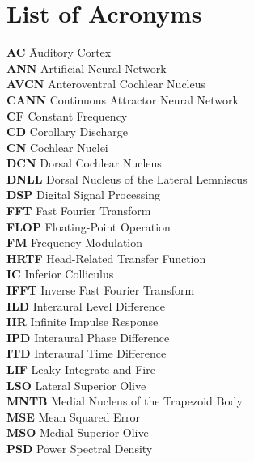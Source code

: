 
\chapter*{List of Acronyms}

\begin{tabbing}
    \textbf{AC} \qquad \= Auditory Cortex \\
    \textbf{ANN} \> Artificial Neural Network \\
    \textbf{AVCN} \> Anteroventral Cochlear Nucleus \\
    \textbf{CANN} \> Continuous Attractor Neural Network \\
    \textbf{CF} \> Constant Frequency \\
    \textbf{CD} \> Corollary Discharge \\
    \textbf{CN} \> Cochlear Nuclei \\
    \textbf{DCN} \> Dorsal Cochlear Nucleus \\
    \textbf{DNLL} \> Dorsal Nucleus of the Lateral Lemniscus \\
    \textbf{DSP} \> Digital Signal Processing \\
    \textbf{FFT} \> Fast Fourier Transform \\
    \textbf{FLOP} \> Floating-Point Operation \\
    \textbf{FM} \> Frequency Modulation \\
    \textbf{HRTF} \> Head-Related Transfer Function \\
    \textbf{IC} \> Inferior Colliculus \\
    \textbf{IFFT} \> Inverse Fast Fourier Transform \\
    \textbf{ILD} \> Interaural Level Difference \\
    \textbf{IIR} \> Infinite Impulse Response \\
    \textbf{IPD} \> Interaural Phase Difference \\
    \textbf{ITD} \> Interaural Time Difference \\
    \textbf{LIF} \> Leaky Integrate-and-Fire \\
    \textbf{LSO} \> Lateral Superior Olive \\
    \textbf{MNTB} \> Medial Nucleus of the Trapezoid Body \\
    \textbf{MSE} \> Mean Squared Error \\
    \textbf{MSO} \> Medial Superior Olive \\
    \textbf{PSD} \> Power Spectral Density \\

\end{tabbing}
